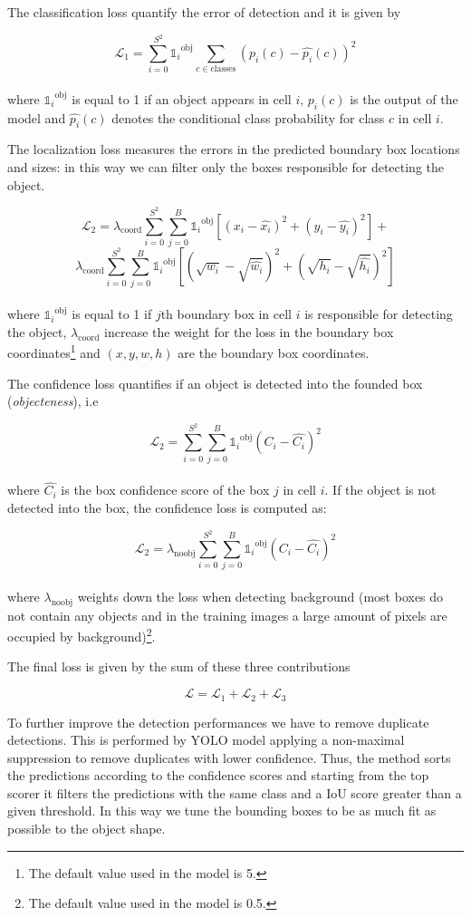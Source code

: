 \documentclass{standalone}
\begin{document}
The classification loss quantify the error of detection and it is given by

$$
\mathcal{L}_1 = \sum_{i=0}^{S^2} {\mathds{1}_i}^{\mbox{obj}} \sum_{c \in \mbox{classes}} \left(p_i(c) - \hat{p_i}(c)\right)^2
$$
\\where ${\mathds{1}_i}^{\mbox{obj}}$ is equal to 1 if an object appears in cell $i$, $p_i(c)$ is the output of the model and $\hat{p_i}(c)$ denotes the conditional class probability for class $c$ in cell $i$.

The localization loss measures the errors in the predicted boundary box locations and sizes: in this way we can filter only the boxes responsible for detecting the object.

$$
\mathcal{L}_2 = \lambda_{\mbox{coord}} \sum_{i=0}^{S^2}\sum_{j=0}^B {\mathds{1}_i}^{\mbox{obj}} \left[ (x_i - \hat{x_i})^2 + (y_i - \hat{y_i})^2 \right] +
$$
$$
\lambda_{\mbox{coord}} \sum_{i=0}^{S^2}\sum_{j=0}^B {\mathds{1}_i}^{\mbox{obj}} \left[ (\sqrt{w_i} - \sqrt{\hat{w_i}})^2 + (\sqrt{h_i} - \sqrt{\hat{h_i}})^2 \right]
$$
\\
where ${\mathds{1}_i}^{\mbox{obj}}$ is equal to 1 if $j$th boundary box in cell $i$ is responsible for detecting the object, $\lambda_{\mbox{coord}}$ increase the weight for the loss in the boundary box coordinates\footnote{
  The default value used in the model is 5.
} and $(x, y, w, h)$ are the boundary box coordinates.

The confidence loss quantifies if an object is detected into the founded box (\emph{objecteness}), i.e

$$
\mathcal{L}_2 = \sum_{i=0}^{S^2}\sum_{j=0}^B {\mathds{1}_i}^{\mbox{obj}} \left(C_i - \hat{C_i} \right)^2
$$
\\
where $\hat{C_i}$ is the box confidence score of the box $j$ in cell $i$.
If the object is not detected into the box, the confidence loss is computed as:

$$
\mathcal{L}_2 = \lambda_{\mbox{noobj}}\sum_{i=0}^{S^2}\sum_{j=0}^B {\mathds{1}_i}^{\mbox{obj}} \left(C_i - \hat{C_i} \right)^2
$$
\\
where $\lambda_{\mbox{noobj}}$ weights down the loss when detecting background (most boxes do not contain any objects and in the training images a large amount of pixels are occupied by background)\footnote{
  The default value used in the model is 0.5.
}.

The final loss is given by the sum of these three contributions

$$
\mathcal{L} = \mathcal{L}_1 + \mathcal{L}_2 + \mathcal{L}_3
$$

To further improve the detection performances we have to remove duplicate detections.
This is performed by YOLO model applying a non-maximal suppression to remove duplicates with lower confidence.
Thus, the method sorts the predictions according to the confidence scores and starting from the top scorer it filters the predictions with the same class and a IoU score greater than a given threshold.
In this way we tune the bounding boxes to be as much fit as possible to the object shape.
\end{document}
